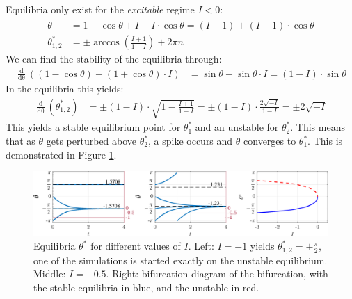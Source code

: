 Equilibria only exist for the \textsl{excitable} regime $I < 0$: 
\begin{align*}
\dot{\theta} &= 1-\cos \theta+I+I \cdot \cos \theta = (I+1)+(I-1) \cdot \cos \theta \\
\theta^{\ast}_{1, 2} &= \pm \arccos \left(\frac{I+1}{1-I}\right)+2 \pi n
\end{align*}
We can find the stability of the equilibria through:
\begin{align*}
\frac{\mathop{d}}{\mathop{d \theta}}((1-\cos \theta)+(1+\cos \theta) \cdot I) &= \sin \theta-\sin \theta \cdot I = (1-I) \cdot \sin \theta
\end{align*}
In the equilibria this yields:
\begin{align*}
\frac{\mathop{d}}{\mathop{d \theta}}\left( \theta^{\ast}_{1, 2} \right) &= \pm(1-I) \cdot \sqrt{1-\frac{I+1}{1-I}}=\pm(1-I) \cdot \frac{2 \sqrt{-I}}{1-I} = \pm2 \sqrt{-I}
\end{align*}
This yields a stable equilibrium point for $\theta^{\ast}_{1}$ and an unstable for $\theta^{\ast}_{2}$. This means that as $\theta$ gets perturbed above $\theta^{\ast}_{2}$, a spike occurs and $\theta$ converges to $\theta^{\ast}_{1}$. This is demonstrated in Figure \ref{fig:ThetaModelEquilibriumPoints}.
\begin{figure}[H]
\centering
\includegraphics[width = \textwidth]{../Figures/ThetaModelEquilibriumPoints.pdf}
\caption{Equilibria $\theta^{\ast}$ for different values of $I$. Left: $I = -1$ yields $\theta^{\ast}_{1,2} = \pm \frac{\pi}{2}$, one of the simulations is started exactly on the unstable equilibrium. Middle: $I = -0.5$. Right: bifurcation diagram of the \SNIC bifurcation, with the stable equilibria in blue, and the unstable in red.}
\label{fig:ThetaModelEquilibriumPoints}
\end{figure}


